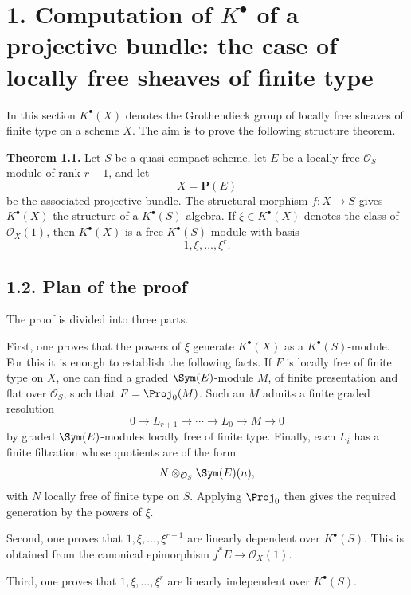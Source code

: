 \section*{1. Computation of \(K^\bullet\) of a projective bundle: the case of locally free sheaves of finite type}

In this section \(K^\bullet(X)\) denotes the Grothendieck group of locally free sheaves of finite type on a scheme \(X\). The aim is to prove the following structure theorem.

\textbf{Theorem 1.1.} Let \(S\) be a quasi-compact scheme, let \(E\) be a locally free \(\mathcal O_S\)-module of rank \(r+1\), and let
\[
  X=\mathbf P(E)
\]
be the associated projective bundle. The structural morphism \(f:X\to S\) gives \(K^\bullet(X)\) the structure of a \(K^\bullet(S)\)-algebra. If \(\xi\in K^\bullet(X)\) denotes the class of \(\mathcal O_X(1)\), then \(K^\bullet(X)\) is a free \(K^\bullet(S)\)-module with basis
\[
  1,\xi,\ldots,\xi^r .
\]

\subsection*{1.2. Plan of the proof}
The proof is divided into three parts.

First, one proves that the powers of \(\xi\) generate \(K^\bullet(X)\) as a \(K^\bullet(S)\)-module. For this it is enough to establish the following facts. If \(F\) is locally free of finite type on \(X\), one can find a graded \(\Sym(E)\)-module \(M\), of finite presentation and flat over \(\mathcal O_S\), such that \(F=\Proj_0(M)\). Such an \(M\) admits a finite graded resolution
\[
  0\longrightarrow L_{r+1}\longrightarrow \cdots \longrightarrow L_0\longrightarrow M\longrightarrow 0
\]
by graded \(\Sym(E)\)-modules locally free of finite type. Finally, each \(L_i\) has a finite filtration whose quotients are of the form
\[
  N\otimes_{\mathcal O_S}\Sym(E)(n),
\]
with \(N\) locally free of finite type on \(S\). Applying \(\Proj_0\) then gives the required generation by the powers of \(\xi\).

Second, one proves that \(1,\xi,\ldots,\xi^{r+1}\) are linearly dependent over \(K^\bullet(S)\). This is obtained from the canonical epimorphism \(f^*E\to\mathcal O_X(1)\).

Third, one proves that \(1,\xi,\ldots,\xi^r\) are linearly independent over \(K^\bullet(S)\).

